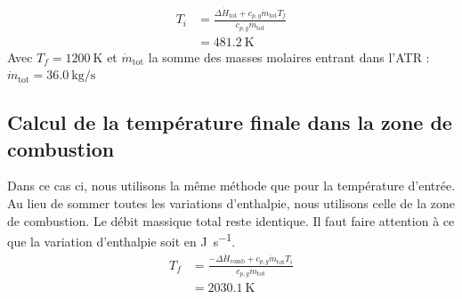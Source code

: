 \documentclass[french, a4paper, 10pt]{article}
\begin{document}
\begin{align*}
T_i &= \frac{\Delta\dot{H}_\text{tot}+c_{p,g}\dot{m}_\text{tot}T_f}{c_{p,g}\dot{m}_\text{tot}}\\
&= \SI{481.2}{\kelvin}
\end{align*}
Avec $T_f = \SI{1200}{\kelvin}$ et $\dot{m}_\text{tot}$ la somme des masses molaires entrant dans l'ATR : $\dot{m}_\text{tot} = \SI{36.0}{\kilo\gram\per\second}$

\subsection{Calcul de la température finale dans la zone de combustion}
Dans ce cas ci, nous utilisons la même méthode que pour la température d'entrée. Au lieu de sommer toutes les variations d'enthalpie, nous utilisons celle de la zone de combustion. Le débit massique total reste identique. Il faut faire attention à ce que la variation d'enthalpie soit en \si{\joule\per\second}.
\begin{align*}
T_f &= \frac{-\Delta\dot{H}_\text{comb}+c_{p,g}\dot{m}_\text{tot}T_i}{c_{p,g}\dot{m}_\text{tot}}\\
&= \SI{2030.1}{\kelvin}
\end{align*}
\end{document}
